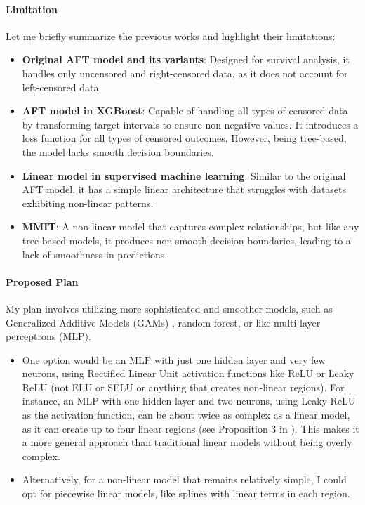 \documentclass[12pt]{article}
\begin{document}
\paragraph{Limitation} Let me briefly summarize the previous works and highlight their limitations:
\begin{itemize}
    \item \textbf{Original AFT model and its variants}: Designed for survival analysis, it handles only uncensored and right-censored data, as it does not account for left-censored data.
    \item \textbf{AFT model in XGBoost}: Capable of handling all types of censored data by transforming target intervals to ensure non-negative values. It introduces a loss function for all types of censored outcomes. However, being tree-based, the model lacks smooth decision boundaries.
    \item \textbf{Linear model in supervised machine learning}: Similar to the original AFT model, it has a simple linear architecture that struggles with datasets exhibiting non-linear patterns.
    \item \textbf{MMIT}: A non-linear model that captures complex relationships, but like any tree-based models, it produces non-smooth decision boundaries, leading to a lack of smoothness in predictions.
\end{itemize}

\paragraph{Proposed Plan} My plan involves utilizing more sophisticated and smoother models, such as Generalized Additive Models (GAMs) \citep{hastie2017generalized}, random forest, or like multi-layer perceptrons (MLP). 
\begin{itemize}
    \item One option would be an MLP with just one hidden layer and very few neurons, using Rectified Linear Unit activation functions like ReLU or Leaky ReLU (not ELU or SELU or anything that creates non-linear regions). For instance, an MLP with one hidden layer and two neurons, using Leaky ReLU as the activation function, can be about twice as complex as a linear model, as it can create up to four linear regions (see Proposition 3 in \citep{montufar2014number}). This makes it a more general approach than traditional linear models without being overly complex.
    
    \item Alternatively, for a non-linear model that remains relatively simple, I could opt for piecewise linear models, like splines \citep{friedman1991multivariate} with linear terms in each region.
    

\end{itemize}
\end{document}
